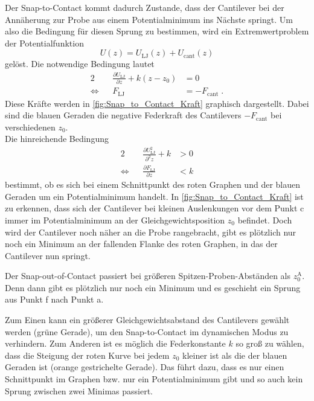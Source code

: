     \FloatBarrier
    Der Snap-to-Contact kommt dadurch Zustande, dass der Cantilever bei der Annäherung zur Probe aus einem Potentialminimum ins Nächste springt.
    Um also die Bedingung für diesen Sprung zu bestimmen, wird ein Extremwertproblem der Potentialfunktion
    \begin{equation}
        U(z) = U_{\mathrm{LJ}}(z) + U_{\mathrm{cant}}(z)
    \end{equation}
    gelöst. Die notwendige Bedingung lautet
    \begin{alignat}{2}
        && \frac{\partial U_{\mathrm{LJ}}}{\partial z} + k(z - z_0) &= 0 \nonumber\\
        \Leftrightarrow && F_{\mathrm{LJ}} &= -F_{\mathrm{cant}} \;.
    \end{alignat}
    Diese Kräfte werden in \autoref{fig:Snap_to_Contact_Kraft} graphisch dargestellt.
    Dabei sind die blauen Geraden die negative Federkraft des Cantilevers $-F_{\mathrm{cant}}$ bei verschiedenen $z_0$. \\
    Die hinreichende Bedingung
    \begin{alignat}{2}
        && \frac{\partial U_{\mathrm{LJ}}^2}{\partial^2 z} + k &> 0 \nonumber\\[3pt]
        \Leftrightarrow && \frac{\partial F_{\mathrm{LJ}}}{\partial z} &< k
    \end{alignat}
    bestimmt, ob es sich bei einem Schnittpunkt des roten Graphen und der blauen Geraden um ein Potentialminimum handelt.
    In \autoref{fig:Snap_to_Contact_Kraft} ist zu erkennen, dass sich der Cantilever bei kleinen Auslenkungen vor dem Punkt c immer im Potentialminimum an der Gleichgewichtsposition $z_0$ befindet.
    Doch wird der Cantilever noch näher an die Probe rangebracht, gibt es plötzlich nur noch ein Minimum an der fallenden Flanke des roten Graphen, in das der Cantilever nun springt.

    Der Snap-out-of-Contact passiert bei größeren Spitzen-Proben-Abständen als $z_0^{\mathrm{A}}$. Denn dann gibt es plötzlich nur noch ein Minimum und es geschieht ein Sprung aus Punkt f nach Punkt a.

    Zum Einen kann ein größerer Gleichgewichtsabstand des Cantilevers gewählt werden (grüne Gerade), um den Snap-to-Contact im dynamischen Modus zu verhindern.
    Zum Anderen ist es möglich die Federkonstante $k$ so groß zu wählen, dass die Steigung der roten Kurve bei jedem $z_0$ kleiner ist als die der blauen Geraden ist (orange gestrichelte Gerade).
    Das führt dazu, dass es nur einen Schnittpunkt im Graphen bzw. nur ein Potentialminimum gibt und so auch kein Sprung zwischen zwei Minimas passiert.

